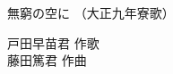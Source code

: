 \documentclass[10pt,b5j]{tarticle} %
\begin{document}
\begin{minipage}[c]{0.7\hsize} %
    \begin{center}
        {\LARGE
            無窮の空に %
        }
        {\small 
            （大正九年寮歌） %
        }
    \end{center}
\end{minipage}
\begin{minipage}[c]{0.3\hsize} %
    \begin{flushright} %
        戸田早苗君 作歌\\藤田篤君 作曲 %
    \end{flushright}
\end{minipage}
\end{document}

